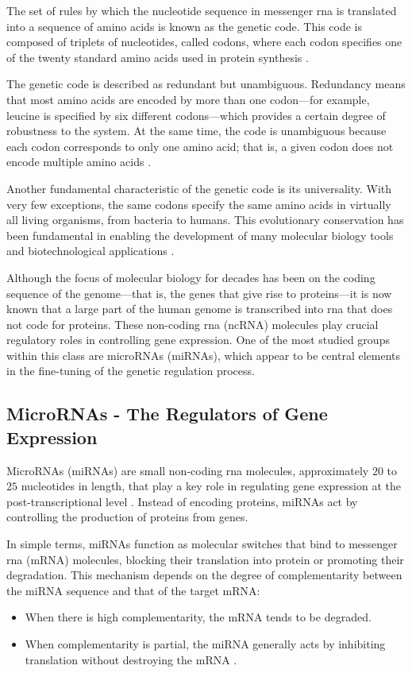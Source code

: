 The set of rules by which the nucleotide sequence in messenger \gls{rna}
is translated into a sequence of amino acids is known as the genetic code. This
code is composed of triplets of nucleotides, called codons, where each codon
specifies one of the twenty standard amino acids used in protein synthesis
\textcite{genetic_codeNovozhilov2008O}.

The genetic code is described as redundant but unambiguous. Redundancy means
that most amino acids are encoded by more than one codon—for example, leucine
is specified by six different codons—which provides a certain degree of
robustness to the system. At the same time, the code is unambiguous because
each codon corresponds to only one amino acid; that is, a given codon does not
encode multiple amino acids \textcite{ConceptsBiology_DNA}.

Another fundamental characteristic of the genetic code is its universality.
With very few exceptions, the same codons specify the same amino acids in
virtually all living organisms, from bacteria to humans. This evolutionary
conservation has been fundamental in enabling the development of many molecular
biology tools and biotechnological applications
\textcite{genetic_codeKoonin2017}.

Although the focus of molecular biology for decades has been on the coding
sequence of the genome—that is, the genes that give rise to proteins—it is now
known that a large part of the human genome is transcribed into \gls{rna}
that does not code for proteins. These non-coding \gls{rna} (ncRNA)
molecules play crucial regulatory roles in controlling gene expression. One of
the most studied groups within this class are microRNAs (miRNAs), which appear
to be central elements in the fine-tuning of the genetic regulation process.

\subsection*{MicroRNAs - The Regulators of Gene Expression}
MicroRNAs (miRNAs) are small non-coding \gls{rna} molecules, approximately
$20$ to $25$ nucleotides in length, that play a key role in regulating gene
expression at the post-transcriptional level
\textcite{regulatory_mecha_mirnaGulyaeva2016,
  first_mirna_Ambros1993,post_transcript_wightman1993}. Instead of encoding
proteins, miRNAs act by controlling the production of proteins from genes.

In simple terms, miRNAs function as molecular switches that bind to messenger
\gls{rna} (mRNA) molecules, blocking their translation into protein or
promoting their degradation. This mechanism depends on the degree of
complementarity between the miRNA sequence and that of the target mRNA:
\begin{itemize}
  \item When there is high complementarity, the mRNA tends to be degraded.
  \item When complementarity is partial, the miRNA generally acts by inhibiting
        translation without destroying the mRNA \textcite{role_mirna_Calaf2023}.
\end{itemize}

